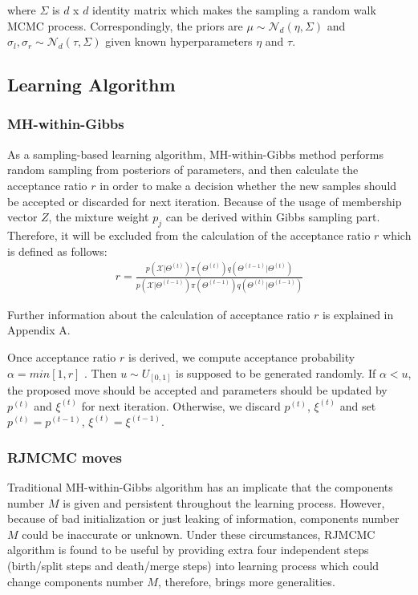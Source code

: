 \documentclass[conference]{IEEEtran}
\begin{document}
where $\Sigma$ is $d$ x $d$ identity matrix which makes the sampling a random walk MCMC process. Correspondingly, the priors are $\mu \sim \mathcal{N}_d(\eta,\Sigma)$ and $\sigma_l, \sigma_r \sim \mathcal{N}_d(\tau,\Sigma)$ given known hyperparameters $\eta$ and $\tau$.

\subsection{Learning Algorithm}
\subsubsection*{MH-within-Gibbs}
As a sampling-based learning algorithm, MH-within-Gibbs method performs random sampling from posteriors of parameters, and then calculate the acceptance ratio $r$ in order to make a decision whether the new samples should be accepted or discarded for next iteration. Because of the usage of membership vector $Z$, the mixture weight $p_j$ can be derived within Gibbs sampling part. Therefore, it will be excluded from the calculation of the acceptance ratio $r$ which is defined as follows:
\begin{align}
r = \frac{p(\mathcal{X}|\Theta^{(t)})\pi(\Theta^{(t)})q(\Theta^{(t-1)}|\Theta^{(t)})}{p(\mathcal{X}|\Theta^{(t-1)})\pi(\Theta^{(t-1)})q(\Theta^{(t)}|\Theta^{(t-1)})}
\label{eq:r}
\end{align}

Further information about the calculation of acceptance ratio $r$ is explained in Appendix A.

Once acceptance ratio $r$ is derived, we compute acceptance probability $\alpha = min[1,r]$ \cite{b11}. Then $u \sim U_{[0,1]}$ is supposed to be generated randomly. If $\alpha < u$, the proposed move should be accepted and parameters should be updated by $p^{(t)}$ and $\xi^{(t)}$ for next iteration. Otherwise, we discard $p^{(t)}$, $\xi^{(t)}$ and set $p^{(t)} = p^{(t-1)}$, $\xi^{(t)} = \xi^{(t-1)}$. 
\bigskip

\subsubsection*{RJMCMC moves}
Traditional MH-within-Gibbs algorithm has an implicate that the components number $M$ is given and persistent throughout the learning process. However, because of bad initialization or just leaking of information, components number $M$ could be inaccurate or unknown. Under these circumstances, RJMCMC algorithm is found to be useful by providing extra four independent steps (birth/split steps and death/merge steps) into learning process which could change components number $M$, therefore, brings more generalities.
\end{document}
